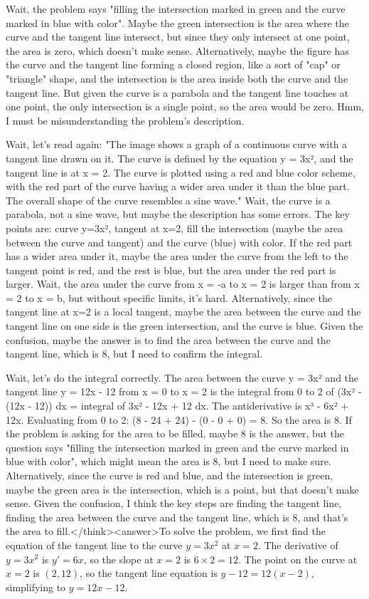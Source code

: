 Wait, the problem says "filling the intersection marked in green and the curve marked in blue with color". Maybe the green intersection is the area where the curve and the tangent line intersect, but since they only intersect at one point, the area is zero, which doesn't make sense. Alternatively, maybe the figure has the curve and the tangent line forming a closed region, like a sort of "cap" or "triangle" shape, and the intersection is the area inside both the curve and the tangent line. But given the curve is a parabola and the tangent line touches at one point, the only intersection is a single point, so the area would be zero. Hmm, I must be misunderstanding the problem's description.

Wait, let's read again: "The image shows a graph of a continuous curve with a tangent line drawn on it. The curve is defined by the equation y = 3x², and the tangent line is at x = 2. The curve is plotted using a red and blue color scheme, with the red part of the curve having a wider area under it than the blue part. The overall shape of the curve resembles a sine wave." Wait, the curve is a parabola, not a sine wave, but maybe the description has some errors. The key points are: curve y=3x², tangent at x=2, fill the intersection (maybe the area between the curve and tangent) and the curve (blue) with color. If the red part has a wider area under it, maybe the area under the curve from the left to the tangent point is red, and the rest is blue, but the area under the red part is larger. Wait, the area under the curve from x = -a to x = 2 is larger than from x = 2 to x = b, but without specific limits, it's hard. Alternatively, since the tangent line at x=2 is a local tangent, maybe the area between the curve and the tangent line on one side is the green intersection, and the curve is blue. Given the confusion, maybe the answer is to find the area between the curve and the tangent line, which is 8, but I need to confirm the integral.

Wait, let's do the integral correctly. The area between the curve y = 3x² and the tangent line y = 12x - 12 from x = 0 to x = 2 is the integral from 0 to 2 of (3x² - (12x - 12)) dx = integral of 3x² - 12x + 12 dx. The antiderivative is x³ - 6x² + 12x. Evaluating from 0 to 2: (8 - 24 + 24) - (0 - 0 + 0) = 8. So the area is 8. If the problem is asking for the area to be filled, maybe 8 is the answer, but the question says "filling the intersection marked in green and the curve marked in blue with color", which might mean the area is 8, but I need to make sure. Alternatively, since the curve is red and blue, and the intersection is green, maybe the green area is the intersection, which is a point, but that doesn't make sense. Given the confusion, I think the key steps are finding the tangent line, finding the area between the curve and the tangent line, which is 8, and that's the area to fill.</think><answer>To solve the problem, we first find the equation of the tangent line to the curve \( y = 3x^2 \) at \( x = 2 \). The derivative of \( y = 3x^2 \) is \( y' = 6x \), so the slope at \( x = 2 \) is \( 6 \times 2 = 12 \). The point on the curve at \( x = 2 \) is \( (2, 12) \), so the tangent line equation is \( y - 12 = 12(x - 2) \), simplifying to \( y = 12x - 12 \).

